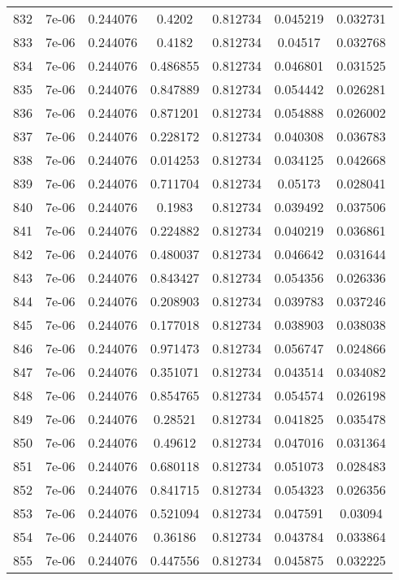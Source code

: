 \begin{table}
\begin{tabular*}{\linewidth}{c|c|c|c|c|c|c}
832 & 7e-06 & 0.244076 & 0.4202 & 0.812734 & 0.045219 & 0.032731\\
833 & 7e-06 & 0.244076 & 0.4182 & 0.812734 & 0.04517 & 0.032768\\
834 & 7e-06 & 0.244076 & 0.486855 & 0.812734 & 0.046801 & 0.031525\\
835 & 7e-06 & 0.244076 & 0.847889 & 0.812734 & 0.054442 & 0.026281\\
836 & 7e-06 & 0.244076 & 0.871201 & 0.812734 & 0.054888 & 0.026002\\
837 & 7e-06 & 0.244076 & 0.228172 & 0.812734 & 0.040308 & 0.036783\\
838 & 7e-06 & 0.244076 & 0.014253 & 0.812734 & 0.034125 & 0.042668\\
839 & 7e-06 & 0.244076 & 0.711704 & 0.812734 & 0.05173 & 0.028041\\
840 & 7e-06 & 0.244076 & 0.1983 & 0.812734 & 0.039492 & 0.037506\\
841 & 7e-06 & 0.244076 & 0.224882 & 0.812734 & 0.040219 & 0.036861\\
842 & 7e-06 & 0.244076 & 0.480037 & 0.812734 & 0.046642 & 0.031644\\
843 & 7e-06 & 0.244076 & 0.843427 & 0.812734 & 0.054356 & 0.026336\\
844 & 7e-06 & 0.244076 & 0.208903 & 0.812734 & 0.039783 & 0.037246\\
845 & 7e-06 & 0.244076 & 0.177018 & 0.812734 & 0.038903 & 0.038038\\
846 & 7e-06 & 0.244076 & 0.971473 & 0.812734 & 0.056747 & 0.024866\\
847 & 7e-06 & 0.244076 & 0.351071 & 0.812734 & 0.043514 & 0.034082\\
848 & 7e-06 & 0.244076 & 0.854765 & 0.812734 & 0.054574 & 0.026198\\
849 & 7e-06 & 0.244076 & 0.28521 & 0.812734 & 0.041825 & 0.035478\\
850 & 7e-06 & 0.244076 & 0.49612 & 0.812734 & 0.047016 & 0.031364\\
851 & 7e-06 & 0.244076 & 0.680118 & 0.812734 & 0.051073 & 0.028483\\
852 & 7e-06 & 0.244076 & 0.841715 & 0.812734 & 0.054323 & 0.026356\\
853 & 7e-06 & 0.244076 & 0.521094 & 0.812734 & 0.047591 & 0.03094\\
854 & 7e-06 & 0.244076 & 0.36186 & 0.812734 & 0.043784 & 0.033864\\
855 & 7e-06 & 0.244076 & 0.447556 & 0.812734 & 0.045875 & 0.032225\\
\end{tabular*}
\end{table}
